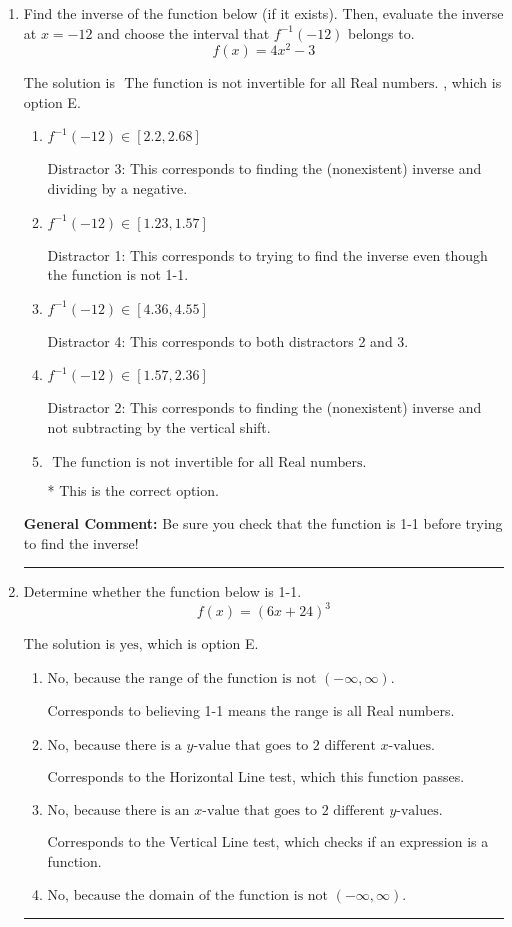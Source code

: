 \documentclass{extbook}[14pt]
\newcommand{\litem}[1]{\item #1

\rule{\textwidth}{0.4pt}}
\begin{document}
\begin{enumerate}\litem{
Find the inverse of the function below (if it exists). Then, evaluate the inverse at $x = -12$ and choose the interval that $f^{-1}(-12)$ belongs to.
\[ f(x) = 4 x^2 - 3 \]

The solution is \( \text{ The function is not invertible for all Real numbers. } \), which is option E.\begin{enumerate}[label=\Alph*.]
\item \( f^{-1}(-12) \in [2.2, 2.68] \)

 Distractor 3: This corresponds to finding the (nonexistent) inverse and dividing by a negative.
\item \( f^{-1}(-12) \in [1.23, 1.57] \)

 Distractor 1: This corresponds to trying to find the inverse even though the function is not 1-1. 
\item \( f^{-1}(-12) \in [4.36, 4.55] \)

 Distractor 4: This corresponds to both distractors 2 and 3.
\item \( f^{-1}(-12) \in [1.57, 2.36] \)

 Distractor 2: This corresponds to finding the (nonexistent) inverse and not subtracting by the vertical shift.
\item \( \text{ The function is not invertible for all Real numbers. } \)

* This is the correct option.
\end{enumerate}

\textbf{General Comment:} Be sure you check that the function is 1-1 before trying to find the inverse!
}
\litem{
Determine whether the function below is 1-1.
\[ f(x) = (6 x + 24)^3 \]

The solution is \( \text{yes} \), which is option E.\begin{enumerate}[label=\Alph*.]
\item \( \text{No, because the range of the function is not $(-\infty, \infty)$.} \)

Corresponds to believing 1-1 means the range is all Real numbers.
\item \( \text{No, because there is a $y$-value that goes to 2 different $x$-values.} \)

Corresponds to the Horizontal Line test, which this function passes.
\item \( \text{No, because there is an $x$-value that goes to 2 different $y$-values.} \)

Corresponds to the Vertical Line test, which checks if an expression is a function.
\item \( \text{No, because the domain of the function is not $(-\infty, \infty)$.} \)


\end{enumerate}}
\end{enumerate}
\end{document}
